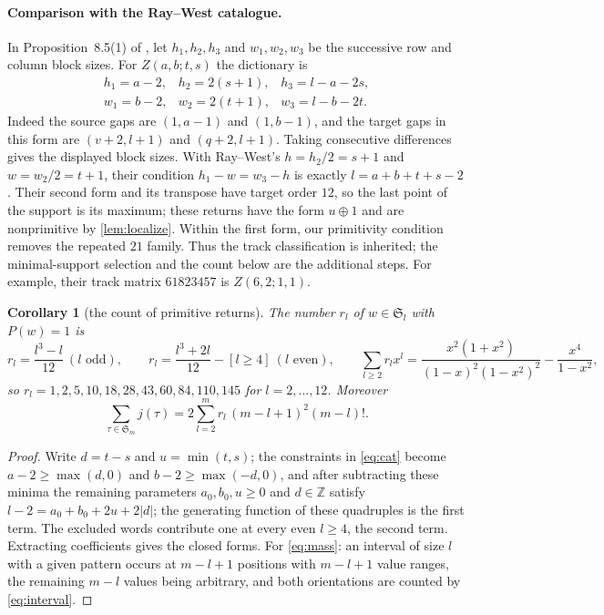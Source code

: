 \documentclass[11pt,reqno]{amsart}
\theoremstyle{plain}
\newtheorem{corollary}[corollary]{Corollary}
\theoremstyle{definition}
\theoremstyle{remark}
\newcommand{\Sym}{\mathfrak{S}}
\newcommand{\ZZ}{\mathbb{Z}}
\begin{document}
\paragraph{Comparison with the Ray--West catalogue.}
In Proposition~8.5(1) of \cite[pp.~80--81]{RayWest2003}, let
$h_1,h_2,h_3$ and $w_1,w_2,w_3$ be the successive row and column
block sizes. For $Z(a,b;t,s)$ the dictionary is
\[
\begin{array}{lll}
h_1=a-2,&h_2=2(s+1),&h_3=l-a-2s,\\
w_1=b-2,&w_2=2(t+1),&w_3=l-b-2t.
\end{array}
\]
Indeed the source gaps are $(1,a-1)$ and $(1,b-1)$, and the target
gaps in this form are $(v+2,l+1)$ and $(q+2,l+1)$.
Taking consecutive differences gives the displayed block sizes.
With Ray--West's $h=h_2/2=s+1$ and $w=w_2/2=t+1$, their condition
$h_1-w=w_3-h$ is exactly $l=a+b+t+s-2$.
Their second form and its transpose have target order $12$, so the last
point of the support is its maximum; these returns have the form
$u\oplus1$ and are nonprimitive by \cref{lem:localize}.
Within the first form, our primitivity condition removes the repeated
$21$ family. Thus the track classification is inherited; the
minimal-support selection and the count below are the additional steps.
For example, their track matrix $61823457$ is $Z(6,2;1,1)$.

\begin{corollary}[the count of primitive returns]\label{cor:rl}
The number $r_l$ of $w\in\Sym_l$ with $P(w)=1$ is
\[
r_l=\frac{l^3-l}{12}\ (l\text{ odd}),\qquad r_l=\frac{l^3+2l}{12}-[l\ge4]\ (l\text{ even}),\qquad
\sum_{l\ge2}r_lx^l=\frac{x^2(1+x^2)}{(1-x)^2(1-x^2)^2}-\frac{x^4}{1-x^2},
\]
so $r_l=1,2,5,10,18,28,43,60,84,110,145$ for $l=2,\dots,12$. Moreover
\begin{equation}\label{eq:mass}
\sum_{\tau\in\Sym_m}j(\tau)=2\sum_{l=2}^{m}r_l\,(m-l+1)^2(m-l)!.
\end{equation}
\end{corollary}

\begin{proof}
Write $d=t-s$ and $u=\min(t,s)$; the constraints in \eqref{eq:cat} become $a-2\ge\max(d,0)$ and $b-2\ge\max(-d,0)$, and after subtracting these minima the remaining parameters $a_0,b_0,u\ge0$ and $d\in\ZZ$ satisfy $l-2=a_0+b_0+2u+2|d|$; the generating function of these quadruples is the first term. The excluded words contribute one at every even $l\ge4$, the second term. Extracting coefficients gives the closed forms. For \eqref{eq:mass}: an interval of size $l$ with a given pattern occurs at $m-l+1$ positions with $m-l+1$ value ranges, the remaining $m-l$ values being arbitrary, and both orientations are counted by \eqref{eq:interval}.
\end{proof}
\end{document}
